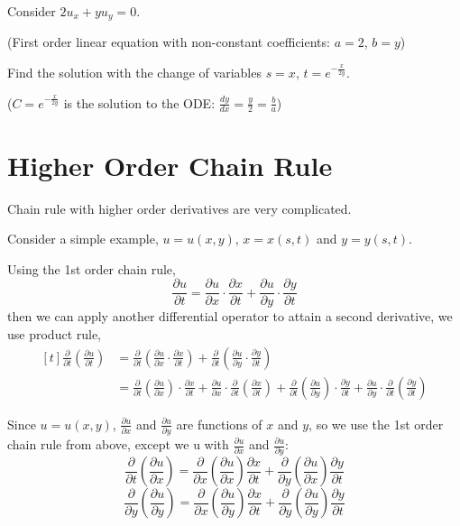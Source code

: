 \documentclass[11pt,fleqn]{book} %
\begin{document}
\begin{exercise}
    Consider $2u_x + yu_y = 0$.

    (First order linear equation with non-constant coefficients: $a = 2$, $b = y$) 

    Find the solution with the change of variables $s = x$, $t = e^{-\frac{x}{2y}}$.

    ($C = e^{-\frac{x}{2y}}$ is the solution to the ODE: $\frac{dy}{dx} = \frac{y}{2} = \frac{b}{a}$)
\end{exercise}

\section{Higher Order Chain Rule}

Chain rule with higher order derivatives are very complicated. 

Consider a simple example, $u = u(x, y)$, $x = x(s, t)$ and $y = y(s, t)$. 

Using the 1st order chain rule, $$\frac{\partial u}{\partial t} = \frac{\partial u}{\partial x} \cdot \frac{\partial x}{\partial t} + \frac{\partial u}{\partial y} \cdot \frac{\partial y}{\partial t}$$ then we can apply another differential operator to attain a second derivative, we use product rule, $$\begin{aligned}[t]
    \frac{\partial}{\partial t}\left(\frac{\partial u}{\partial t}\right) & = \frac{\partial}{\partial t} \left( \frac{\partial u}{\partial x} \cdot \frac{\partial x}{\partial t} \right) + \frac{\partial}{\partial t}\left( \frac{\partial u}{\partial y} \cdot \frac{\partial y}{\partial t} \right) \\
     & = \frac{\partial}{\partial t} \left( \frac{\partial u}{\partial x} \right) \cdot \frac{\partial x}{\partial t} + \frac{\partial u}{\partial x} \cdot \frac{\partial}{\partial t}\left( \frac{\partial x}{\partial t} \right) + \frac{\partial}{\partial t} \left( \frac{\partial u}{\partial y} \right) \cdot \frac{\partial y}{\partial t} + \frac{\partial u}{\partial y} \cdot \frac{\partial }{\partial t} \left( \frac{\partial y}{\partial t} \right)
\end{aligned}$$

Since $u = u(x, y)$, $\frac{\partial u}{\partial x}$ and $\frac{\partial u}{\partial y}$ are  functions of $x$ and $y$, so we use the 1st order chain rule from above, except we  u with $\frac{\partial u}{\partial x}$ and $\frac{\partial u}{\partial y}$: 
$$ \frac{\partial}{\partial t} \left(\frac{\partial u}{\partial x} \right) = \frac{\partial}{\partial x} \left( \frac{\partial u}{\partial x} \right) \frac{\partial x}{\partial t} + \frac{\partial}{\partial y} \left( \frac{\partial u}{\partial x} \right) \frac{\partial y}{\partial t}$$
$$ \frac{\partial}{\partial y} \left(\frac{\partial u}{\partial y} \right) = \frac{\partial}{\partial x} \left( \frac{\partial u}{\partial y} \right) \frac{\partial x}{\partial t} + \frac{\partial}{\partial y} \left( \frac{\partial u}{\partial y} \right) \frac{\partial y}{\partial t}$$
\end{document}
